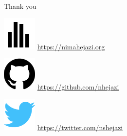\documentclass{beamer}
\begin{document}
\begin{frame}[c]{Thank you}

\includegraphics[scale=0.14]{homepage.png} \url{https://nimahejazi.org}

\vspace{2mm}
\includegraphics[scale=0.11]{github-icon.png}
  \url{https://github.com/nhejazi}

\vspace{2mm}
\includegraphics[scale=0.14]{twitter-icon.png}
  \url{https://twitter.com/nshejazi}


\end{frame}
\end{document}
